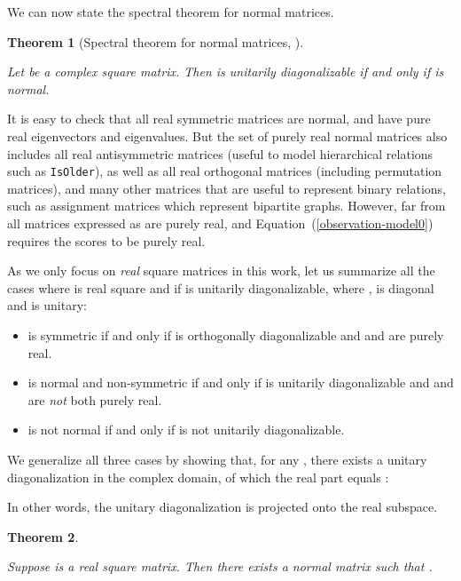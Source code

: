 \documentclass[twoside,11pt]{article}
\newtheorem{thm}{Theorem}
\def\tt{\texttt}
\begin{document}
We can now state the spectral theorem for normal matrices.

\begin{thm}[Spectral theorem for normal matrices, \citet{vonneumann1929}]
\label{spectral_thm}

Let  be a complex square matrix. Then  is unitarily diagonalizable if and only if
 is normal.

\end{thm}


It is easy to check that all real symmetric matrices are normal, and have
pure real eigenvectors and eigenvalues.
But the set of purely real normal matrices also includes all
real antisymmetric matrices (useful to model hierarchical
relations such as \tt{IsOlder}), as well as 
all real orthogonal matrices (including permutation matrices), and many other matrices that are useful to represent binary relations, such as assignment matrices which represent bipartite graphs. However, far from all matrices expressed as  are
purely real, and Equation~(\ref{observation-model0}) requires the scores  to be purely real.

As we only focus on \emph{real} square matrices in this work, let us
summarize all the cases where  is real square and 
if  is unitarily diagonalizable, where ,  is diagonal and  is unitary:


\begin{itemize}
    \item  is symmetric if and only if  is orthogonally diagonalizable and  and  are purely real.
    \item  is normal and non-symmetric if and only if  is unitarily 
    diagonalizable and  and   are \emph{not} both purely real.
    
    \item  is not normal if and only if  is not unitarily diagonalizable.
\end{itemize}

We generalize all three cases by showing that, for any 
, there exists a unitary diagonalization in the complex domain,
of which the real part equals :


In other words, the unitary diagonalization is projected onto the real subspace.


\begin{thm}
\label{main_thm}

Suppose  is a real square matrix. Then there exists
a normal matrix  such that .

\end{thm}
\end{document}
